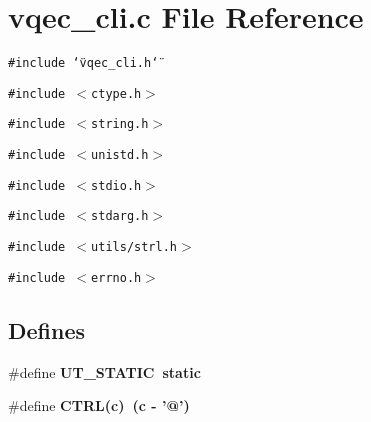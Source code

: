 \section{vqec\_\-cli.c File Reference}
\label{vqec__cli_8c}
{\tt \#include \char`\"{}vqec\_\-cli.h\char`\"{}}\par
{\tt \#include $<$ctype.h$>$}\par
{\tt \#include $<$string.h$>$}\par
{\tt \#include $<$unistd.h$>$}\par
{\tt \#include $<$stdio.h$>$}\par
{\tt \#include $<$stdarg.h$>$}\par
{\tt \#include $<$utils/strl.h$>$}\par
{\tt \#include $<$errno.h$>$}\par
\subsection*{Defines}
\begin{CompactItemize}
\item 
\#define \bf{UT\_\-STATIC}~static
\item 
\#define \bf{CTRL}(c)~(c - '@')
\end{CompactItemize}
